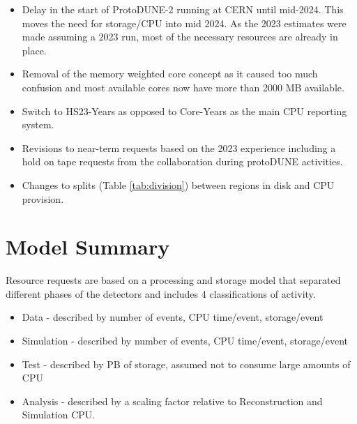 \documentclass[12pt]{article}
\begin{document}
\begin{itemize}
\item Delay in the start of ProtoDUNE-2 running at CERN until mid-2024. This moves the need for storage/CPU into mid 2024. As the 2023 estimates were made assuming a 2023 run, most of the necessary resources are already in place. 
\item Removal of the memory weighted core concept as it caused too much confusion and most available cores now have more than 2000 MB available. 
\item Switch to HS23-Years as opposed to Core-Years as the main CPU reporting system.
\item Revisions to near-term requests based on the 2023 experience including a hold on tape requests from the collaboration during protoDUNE activities. 
\item Changes to splits (Table \ref{tab:division}) between regions in disk and CPU provision. 
\end{itemize}

\section{Model Summary}

Resource requests are based on a processing and storage model that separated different phases of the detectors and includes 4 classifications of activity.

\begin{itemize}
\item Data - described by number of events, CPU time/event, storage/event
\item Simulation - described by number of events,  CPU time/event, storage/event
\item Test - described by PB of storage, assumed not to consume large amounts of CPU
\item Analysis - described by a scaling factor relative to Reconstruction and Simulation CPU.
\end{itemize}
\end{document}
